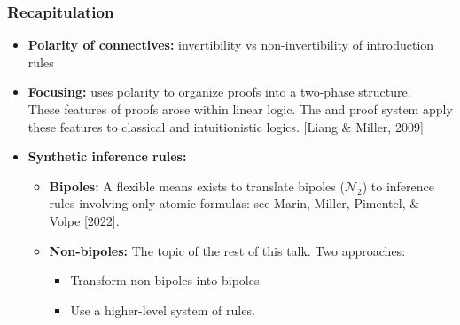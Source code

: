 \documentclass[9pt]{beamer}
\begin{document}
\begin{frame}
\frametitle{Recapitulation}

\begin{itemize}

\item \textbf{Polarity of connectives:} invertibility vs
  non-invertibility of introduction rules\\[10pt]

\item \textbf{Focusing:} uses polarity to organize proofs into a
  two-phase structure.\\[10pt]

  These features of proofs arose within linear logic.  The \LKF and
  \LJF proof system apply these features to classical and
  intuitionistic logics.  [Liang \& Miller, 2009]\\[10pt]

\item \textbf{Synthetic inference rules:}
\pause
  \begin{itemize}
  \item \textbf{Bipoles:} A flexible means exists to translate bipoles
    ($\mathcal{N}_2$) to inference rules involving only atomic
    formulas: see Marin, Miller, Pimentel, \& Volpe [2022].\\[6pt]
\pause

  \item \textbf{Non-bipoles:} The topic of the rest of this talk. Two
    approaches:
    \begin{itemize}
    \item Transform non-bipoles into bipoles.
    \item Use a higher-level system of rules.
    \end{itemize}
  \end{itemize}

\end{itemize}

\end{frame}
\end{document}
